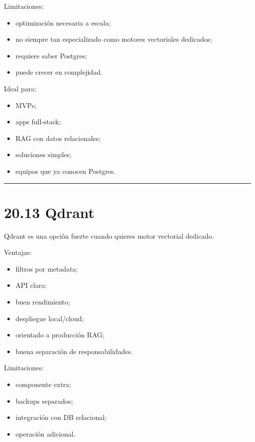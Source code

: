 Limitaciones:

\begin{itemize}
\tightlist
\item
  optimización necesaria a escala;
\item
  no siempre tan especializado como motores vectoriales dedicados;
\item
  requiere saber Postgres;
\item
  puede crecer en complejidad.
\end{itemize}

Ideal para:

\begin{itemize}
\tightlist
\item
  MVPs;
\item
  apps full-stack;
\item
  RAG con datos relacionales;
\item
  soluciones simples;
\item
  equipos que ya conocen Postgres.
\end{itemize}

\begin{center}\rule{0.5\linewidth}{0.5pt}\end{center}

\section{20.13 Qdrant}\label{qdrant-1}

Qdrant es una opción fuerte cuando quieres motor vectorial dedicado.

Ventajas:

\begin{itemize}
\tightlist
\item
  filtros por metadata;
\item
  API clara;
\item
  buen rendimiento;
\item
  despliegue local/cloud;
\item
  orientado a producción RAG;
\item
  buena separación de responsabilidades.
\end{itemize}

Limitaciones:

\begin{itemize}
\tightlist
\item
  componente extra;
\item
  backups separados;
\item
  integración con DB relacional;
\item
  operación adicional.
\end{itemize}

